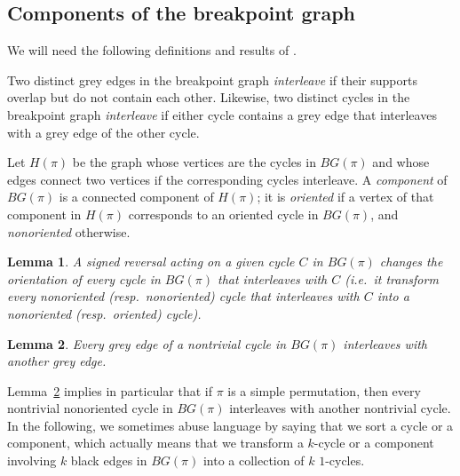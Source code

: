 \documentclass[review]{elsarticle}
\newtheorem{lemma}{Lemma}
\newcommand{\ie}{i.e.\ }
\newcommand{\resp}{resp.\ }
\begin{document}
\subsection{Components of the breakpoint graph}

We will need the following definitions and results of \citet{hannenhalli-transforming}.

\begin{definition}
Two distinct grey edges in the breakpoint graph \emph{interleave} if their supports overlap but do not contain each other. Likewise, two distinct cycles in the breakpoint graph \emph{interleave} if either cycle contains a grey edge that interleaves with a grey edge of the other cycle.
\end{definition}

\begin{definition}\label{def:components-and-orientation-in-BG}
Let $H(\pi)$ be the graph whose vertices are the cycles in $BG(\pi)$ and whose edges connect two vertices if the corresponding cycles interleave. A \emph{component} of $BG(\pi)$ is a connected component of $H(\pi)$; it is \emph{oriented} if a vertex of that component in $H(\pi)$ corresponds to an oriented cycle in $BG(\pi)$, and \emph{nonoriented} otherwise.
\end{definition}


\begin{lemma}\label{lemma:reversals-change-orientation-of-interleaving-cycles}
\cite{hannenhalli-transforming} %
A signed reversal acting on a given cycle $C$ in $BG(\pi)$ changes the orientation of every cycle in $BG(\pi)$ that interleaves with $C$ (\ie it transform every nonoriented (\resp nonoriented) cycle that interleaves with $C$ into a nonoriented (\resp oriented) cycle).
\end{lemma}

\begin{lemma}\label{lemma:every-edge-is-interleaved}
\cite{hannenhalli-transforming} 
Every grey edge of a nontrivial cycle in $BG(\pi)$ interleaves with another grey edge.
\end{lemma}

Lemma~\ref{lemma:every-edge-is-interleaved} implies in particular that if $\pi$ is a simple permutation, then every nontrivial nonoriented cycle in $BG(\pi)$ interleaves with another nontrivial cycle. In the following, we sometimes abuse language by saying that we sort a cycle or a component, which actually means that we transform a $k$-cycle or a component involving $k$ black edges in $BG(\pi)$ into a collection of $k$ $1$-cycles.
\end{document}
